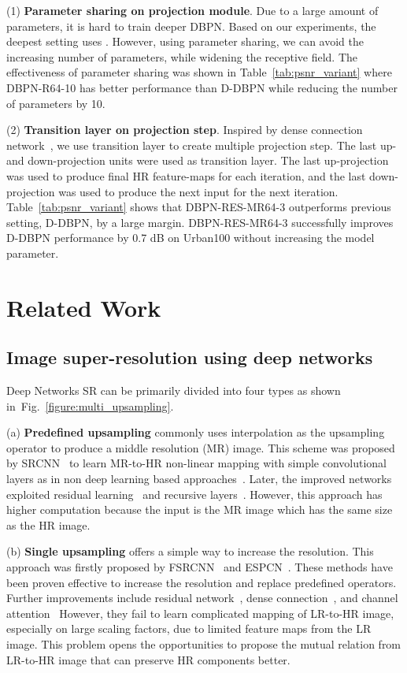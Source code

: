 \documentclass[10pt,journal,compsoc]{IEEEtran}
\begin{document}
\noindent(1) \textbf{Parameter sharing on projection module}. 
Due to a large amount of parameters, it is hard to train deeper DBPN. 
Based on our experiments, the deepest setting uses . 
However, using parameter sharing, we can avoid the increasing number of parameters, while widening the receptive field. 
The effectiveness of parameter sharing was shown in Table~\ref{tab:psnr_variant} where DBPN-R64-10 has better performance than D-DBPN while reducing the number of parameters by 10.

\noindent(2) \textbf{Transition layer on projection step}.
Inspired by dense connection network~\cite{huang2017densely}, we use transition layer to create multiple projection step. 
The last up- and down-projection units were used as transition layer. 
The last up-projection was used to produce final HR feature-maps for each iteration, and the last down-projection was used to produce the next input for the next iteration.
Table~\ref{tab:psnr_variant} shows that DBPN-RES-MR64-3 outperforms previous setting, D-DBPN, by a large margin. DBPN-RES-MR64-3 successfully improves D-DBPN performance by 0.7 dB on Urban100 without increasing the model parameter.




 \section{Related Work}
\label{sec:related}
\subsection{Image super-resolution using deep networks}
Deep Networks SR can be primarily divided into four types as shown in~Fig.~\ref{figure:multi_upsampling}.

(a) \textbf{Predefined upsampling} commonly uses interpolation as the upsampling operator to produce a middle resolution (MR) image. This scheme was proposed by SRCNN~\cite{dong2016image} to learn MR-to-HR non-linear mapping with simple convolutional layers as in non deep learning based approaches~\cite{timofte2014a+,schulter2015fast}. Later, the improved networks exploited residual learning~\cite{Kim_2016_VDSR,Tai-DRRN-2017} and recursive layers~\cite{kim2016deeply}. However, this approach has higher computation because the input is the MR image which has the same size as the HR image.

(b) \textbf{Single upsampling} offers a simple way to increase the resolution. This approach was firstly proposed by FSRCNN~\cite{dong2016accelerating} and ESPCN~\cite{shi2016real}. 
These methods have been proven effective to increase the resolution and replace predefined operators. 
Further improvements include residual network~\cite{Lim_2017_CVPR_Workshops}, dense connection~\cite{zhang2018residual}, and channel attention~\cite{zhang2018image}
However, they fail to learn complicated mapping of LR-to-HR image, especially on large scaling factors, due to limited feature maps from the LR image.
This problem opens the opportunities to propose the mutual relation from LR-to-HR image that can preserve HR components better.
\end{document}
